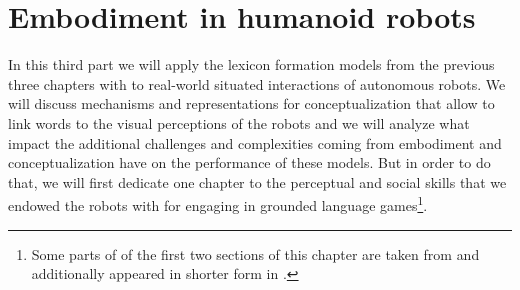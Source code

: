 
\setcounter{chapter}{6}

\chapter{Embodiment in humanoid robots}
\label{c:embodiment}


In this third part we will apply the lexicon formation models from the
previous three chapters with to real-world situated interactions of
autonomous robots. We will discuss mechanisms and representations for
conceptualization that allow to link words to the visual perceptions
of the robots and we will analyze what impact the additional
challenges and complexities coming from embodiment and
conceptualization have on the performance of these models. But in
order to do that, we will first dedicate one chapter to the perceptual
and social skills that we endowed the robots with for engaging in
grounded language games\footnote{Some parts of of the first two
  sections of this chapter are taken from \cite*{loetzsch12grounding}
  and additionally appeared in shorter form in
  \cite*{spranger12perceptual}.}.

